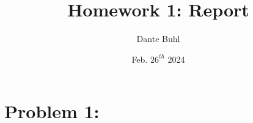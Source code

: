 \documentclass{article}
\title{Homework 1: Report}
\author{Dante Buhl}
\date{Feb. $26^{th}$ 2024}
\begin{document}
\newcommand{\bs}[1]{\boldsymbol{#1}}
\newcommand{\bmp}[1]{\begin{minipage}{#1\textwidth}}
\newcommand{\emp}{\end{minipage}}
\newcommand{\R}{\mathbb{R}}
\newcommand{\C}{\mathbb{C}}
\newcommand{\N}{\mathcal{N}}
\newcommand{\I}{\mathrm{I}}
\newcommand{\K}{\bs{\mathrm{K}}}
\newcommand{\m}{\bs{\mu}_*}
\newcommand{\s}{\bs{\Sigma}_*}
\newcommand{\dt}{\Delta t}
\newcommand{\tr}[1]{\text{Tr}(#1)}
\newcommand{\Tr}[1]{\text{Tr}(#1)}

\maketitle

\section*{Problem 1: }
\end{document}
